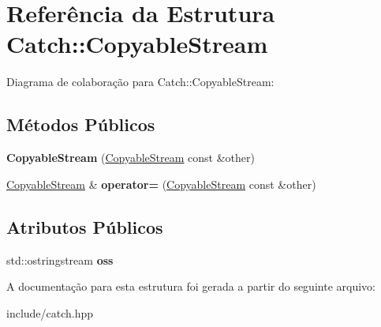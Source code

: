 \hypertarget{structCatch_1_1CopyableStream}{}\section{Referência da Estrutura Catch\+:\+:Copyable\+Stream}
\label{structCatch_1_1CopyableStream}


Diagrama de colaboração para Catch\+:\+:Copyable\+Stream\+:
\subsection*{Métodos Públicos}
\begin{DoxyCompactItemize}
\item 
{\bfseries Copyable\+Stream} (\hyperlink{structCatch_1_1CopyableStream}{Copyable\+Stream} const \&other)\hypertarget{structCatch_1_1CopyableStream_a0e72dc16240653f52c17106f4bf34da8}{}\label{structCatch_1_1CopyableStream_a0e72dc16240653f52c17106f4bf34da8}

\item 
\hyperlink{structCatch_1_1CopyableStream}{Copyable\+Stream} \& {\bfseries operator=} (\hyperlink{structCatch_1_1CopyableStream}{Copyable\+Stream} const \&other)\hypertarget{structCatch_1_1CopyableStream_a1760fa29b38011c5845171260bec0966}{}\label{structCatch_1_1CopyableStream_a1760fa29b38011c5845171260bec0966}

\end{DoxyCompactItemize}
\subsection*{Atributos Públicos}
\begin{DoxyCompactItemize}
\item 
std\+::ostringstream {\bfseries oss}\hypertarget{structCatch_1_1CopyableStream_ae123fb4d673e7d7a13a3c5f6bc5d426c}{}\label{structCatch_1_1CopyableStream_ae123fb4d673e7d7a13a3c5f6bc5d426c}

\end{DoxyCompactItemize}


A documentação para esta estrutura foi gerada a partir do seguinte arquivo\+:\begin{DoxyCompactItemize}
\item 
include/catch.\+hpp\end{DoxyCompactItemize}
